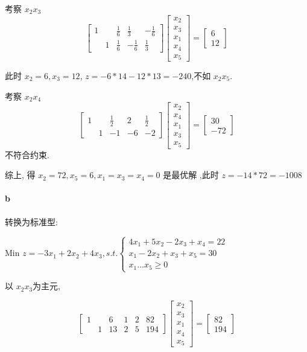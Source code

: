 \documentclass[a4paper]{article}
\begin{document}
考察 $x_2x_3$
\[
\begin{bmatrix}
1 &   & \frac{1}{6} & \frac{1}{3} & -\frac{1}{6}  \\
  & 1 & \frac{1}{6} & -\frac{1}{6} & \frac{1}{3} 
\end{bmatrix}
\begin{bmatrix}
    x_2 \\ x_3 \\ x_1 \\ x_4 \\ x_5
\end{bmatrix} 
= \begin{bmatrix}
  6 \\ 12
\end{bmatrix}
\]

此时 $ x_2 = 6,x_3 = 12$, $z = -6*14  - 12 * 13 = -240$,不如 $x_2x_5$.

考察 $x_2x_4$
\[
\begin{bmatrix}
1 &   & \frac{1}{2} & 2 & \frac{1}{2} \\
  & 1 & -1 & -6 & -2 
\end{bmatrix}
\begin{bmatrix}
    x_2 \\ x_4 \\ x_1 \\ x_3 \\ x_5
\end{bmatrix} 
= \begin{bmatrix}
  30 \\ -72
\end{bmatrix}
\]
不符合约束.

综上, 得 $x_2 = 72, x_5 = 6, x_1 = x_3 = x_4 = 0$ 是最优解 ,此时 $z = -14 * 72 = -1008$
\paragraph{b}

转换为标准型:

Min \(z=-3x_1+2x_2+4x_3 , s.t. \left\{\begin{aligned}
  4x_1+5x_2-2x_3+x_4=22 \\
  x_1-2x_2+x_3+x_5=30 \\
x_1 ... x_5 \geq 0
\end{aligned}\right.\)

以 $x_2x_3$为主元,

\[
\begin{bmatrix}
1 &   & 6 & 1 & 2 & 82 \\
  & 1 & 13 & 2 & 5 & 194
\end{bmatrix}
\begin{bmatrix}
    x_2 \\ x_3 \\ x_1 \\ x_4 \\ x_5
\end{bmatrix} 
= \begin{bmatrix}
  82 \\ 194
\end{bmatrix}
\]
\end{document}
